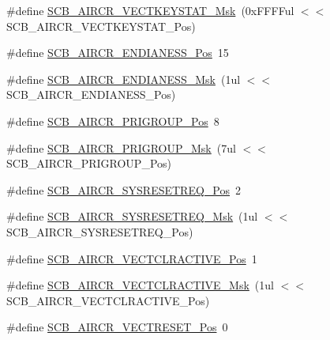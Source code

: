 \begin{DoxyCompactItemize}
\item 
\#define \hyperlink{group___c_m_s_i_s___c_m3___s_c_b_gabacedaefeefc73d666bbe59ece904493}{S\-C\-B\-\_\-\-A\-I\-R\-C\-R\-\_\-\-V\-E\-C\-T\-K\-E\-Y\-S\-T\-A\-T\-\_\-\-Msk}~(0x\-F\-F\-F\-Ful $<$$<$ S\-C\-B\-\_\-\-A\-I\-R\-C\-R\-\_\-\-V\-E\-C\-T\-K\-E\-Y\-S\-T\-A\-T\-\_\-\-Pos)
\item 
\#define \hyperlink{group___c_m_s_i_s___c_m3___s_c_b_gad31dec98fbc0d33ace63cb1f1a927923}{S\-C\-B\-\_\-\-A\-I\-R\-C\-R\-\_\-\-E\-N\-D\-I\-A\-N\-E\-S\-S\-\_\-\-Pos}~15
\item 
\#define \hyperlink{group___c_m_s_i_s___c_m3___s_c_b_ga2f571f93d3d4a6eac9a3040756d3d951}{S\-C\-B\-\_\-\-A\-I\-R\-C\-R\-\_\-\-E\-N\-D\-I\-A\-N\-E\-S\-S\-\_\-\-Msk}~(1ul $<$$<$ S\-C\-B\-\_\-\-A\-I\-R\-C\-R\-\_\-\-E\-N\-D\-I\-A\-N\-E\-S\-S\-\_\-\-Pos)
\item 
\#define \hyperlink{group___c_m_s_i_s___c_m3___s_c_b_gaca155deccdeca0f2c76b8100d24196c8}{S\-C\-B\-\_\-\-A\-I\-R\-C\-R\-\_\-\-P\-R\-I\-G\-R\-O\-U\-P\-\_\-\-Pos}~8
\item 
\#define \hyperlink{group___c_m_s_i_s___c_m3___s_c_b_ga8be60fff03f48d0d345868060dc6dae7}{S\-C\-B\-\_\-\-A\-I\-R\-C\-R\-\_\-\-P\-R\-I\-G\-R\-O\-U\-P\-\_\-\-Msk}~(7ul $<$$<$ S\-C\-B\-\_\-\-A\-I\-R\-C\-R\-\_\-\-P\-R\-I\-G\-R\-O\-U\-P\-\_\-\-Pos)
\item 
\#define \hyperlink{group___c_m_s_i_s___c_m3___s_c_b_gaffb2737eca1eac0fc1c282a76a40953c}{S\-C\-B\-\_\-\-A\-I\-R\-C\-R\-\_\-\-S\-Y\-S\-R\-E\-S\-E\-T\-R\-E\-Q\-\_\-\-Pos}~2
\item 
\#define \hyperlink{group___c_m_s_i_s___c_m3___s_c_b_gaae1181119559a5bd36e62afa373fa720}{S\-C\-B\-\_\-\-A\-I\-R\-C\-R\-\_\-\-S\-Y\-S\-R\-E\-S\-E\-T\-R\-E\-Q\-\_\-\-Msk}~(1ul $<$$<$ S\-C\-B\-\_\-\-A\-I\-R\-C\-R\-\_\-\-S\-Y\-S\-R\-E\-S\-E\-T\-R\-E\-Q\-\_\-\-Pos)
\item 
\#define \hyperlink{group___c_m_s_i_s___c_m3___s_c_b_gaa30a12e892bb696e61626d71359a9029}{S\-C\-B\-\_\-\-A\-I\-R\-C\-R\-\_\-\-V\-E\-C\-T\-C\-L\-R\-A\-C\-T\-I\-V\-E\-\_\-\-Pos}~1
\item 
\#define \hyperlink{group___c_m_s_i_s___c_m3___s_c_b_ga212c5ab1c1c82c807d30d2307aa8d218}{S\-C\-B\-\_\-\-A\-I\-R\-C\-R\-\_\-\-V\-E\-C\-T\-C\-L\-R\-A\-C\-T\-I\-V\-E\-\_\-\-Msk}~(1ul $<$$<$ S\-C\-B\-\_\-\-A\-I\-R\-C\-R\-\_\-\-V\-E\-C\-T\-C\-L\-R\-A\-C\-T\-I\-V\-E\-\_\-\-Pos)
\item 
\#define \hyperlink{group___c_m_s_i_s___c_m3___s_c_b_ga0d483d9569cd9d1b46ec0d171b1f18d8}{S\-C\-B\-\_\-\-A\-I\-R\-C\-R\-\_\-\-V\-E\-C\-T\-R\-E\-S\-E\-T\-\_\-\-Pos}~0
$$
\end{DoxyCompactItemize}

